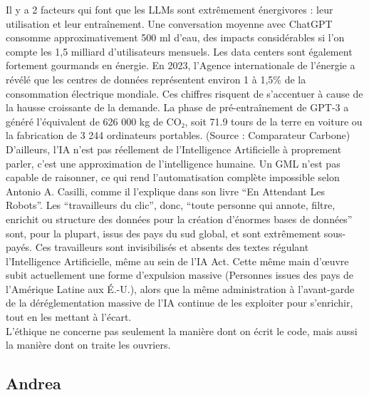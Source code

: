 \documentclass{article}
\begin{document}
Il y a 2 facteurs qui font que les LLMs sont extrêmement énergivores : leur utilisation et leur entraînement. Une conversation moyenne avec ChatGPT consomme approximativement 500 ml d’eau, des impacts considérables si l’on compte les 1,5 milliard d’utilisateurs mensuels. Les data centers sont également fortement gourmands en énergie. En 2023, l’Agence internationale de l’énergie a révélé que les centres de données représentent environ 1 à 1,5\% de la consommation électrique mondiale. Ces chiffres risquent de s'accentuer à cause de la hausse croissante de la demande. La phase de pré-entraînement de GPT-3 a généré l’équivalent de 626 000 kg de CO₂, soit 71.9 tours de la terre en voiture ou la fabrication de 3 244 ordinateurs portables. (Source : Comparateur Carbone)\\

D’ailleurs, l’IA n’est pas réellement de l’Intelligence Artificielle à proprement parler, c’est une approximation de l’intelligence humaine. Un GML n’est pas capable de raisonner, ce qui rend l’automatisation complète impossible selon Antonio A. Casilli, comme il l’explique dans son livre “En Attendant Les Robots”. Les “travailleurs du clic”, donc, “toute personne qui annote, filtre, enrichit ou structure des données pour la création d’énormes bases de données” sont, pour la plupart, issus des pays du sud global, et sont extrêmement sous-payés. Ces travailleurs sont invisibilisés et absents des textes régulant l’Intelligence Artificielle, même au sein de l’IA Act. Cette même main d’œuvre subit actuellement une forme d’expulsion massive (Personnes issues des pays de l’Amérique Latine aux É.-U.), alors que la même administration à l’avant-garde de la déréglementation massive de l’IA continue de les exploiter pour s’enrichir, tout en les mettant à l’écart.\\ 


L’éthique ne concerne pas seulement la manière dont on écrit le code, mais aussi la manière dont on traite les ouvriers.\\ 


\subsection{Andrea}
\end{document}
